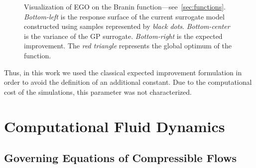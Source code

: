 \begin{figure}[!ht]               
\centering
{}
   
\caption{Visualization of EGO on the Branin function---see~\cref{sec:functions}. \emph{Bottom-left} is the response surface of the current surrogate model constructed using samples represented by \emph{black dots}. \emph{Bottom-center} is the variance of the GP surrogate. \emph{Bottom-right} is the expected improvement. The \emph{red triangle} represents the global optimum of the function.}
\label{fig:branin_ego}
\end{figure}

Thus, in this work we used the classical expected improvement formulation in order to avoid the definition of an additional constant. Due to the computational cost of the simulations, this parameter was not characterized.


\chapter{Computational Fluid Dynamics}
\label{sec:LES}

\section{Governing Equations of Compressible Flows}

